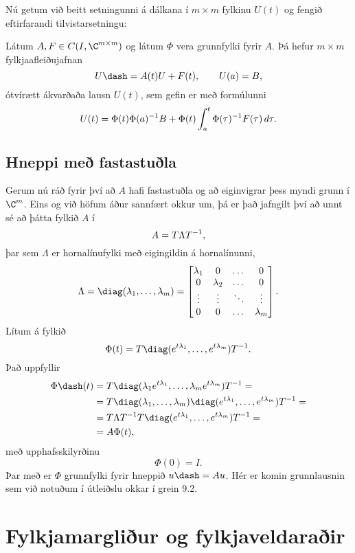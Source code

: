 \medskip
Nú getum við beitt setningunni á dálkana í $m\times m$ fylkinu $U(t)$ og
fengið eftirfarandi
tilvistarsetningu:

\begin{se}
Látum $A, F\in C(I,\C\sp {m\times m})$ og látum $\Phi$ vera grunnfylki
fyrir $A$.  Þá hefur $m\times m$
fylkjaafleiðujafnan
 $$U\dash=A(t)U+F(t), \qquad U(a)=B, 
 $$
ótvírætt ákvarðaða lausn $U(t)$,  sem gefin er með formúlunni
 $$U(t)=\Phi(t)\Phi(a)\sp{-1}B + \Phi(t)\int_a\sp t \Phi(\tau)\sp
{-1}F(\tau) \, d\tau.
 $$
\end{se}

\subsection*{Hneppi með fastastuðla}

Gerum nú ráð fyrir því að $A$ hafi fastastuðla og að eiginvigrar þess
myndi grunn í $\C\sp m$.  Eins og við höfum áður sannfært okkur um,
þá er það jafngilt því að unnt sé að þátta fylkið $A$ í 
 $$A=T\Lambda T\sp{-1},
 $$
þar sem $\Lambda$ er hornalínufylki með eigingildin á hornalínunni,
 $$\Lambda=\diag(\lambda_1,\dots,\lambda_m)=\left[\begin{matrix} 
\lambda_1&0&\dots&0\\
0&\lambda_2&\dots&0\\
\vdots&\vdots&\ddots&\vdots\\
0&0&\dots&\lambda_m\end{matrix}\right].
 $$
Lítum á fylkið 
 $$\Phi(t)=T\diag(e\sp{t\lambda_1},\dots,e\sp{t\lambda_m})T\sp{-1}.
 $$
Það uppfyllir
\begin{align*}
\Phi\dash(t)
&=T\diag(\lambda_1e\sp{t\lambda_1},\dots,\lambda_me\sp{t\lambda_m})T\sp{-1}=\\
&=T\diag(\lambda_1,\dots,\lambda_m)
\diag(e\sp{t\lambda_1},\dots,e\sp{t\lambda_m})T\sp{-1}=\\
&=T\Lambda T\sp{-1} T
\diag(e\sp{t\lambda_1},\dots,e\sp{t\lambda_m})T\sp{-1}=\\
&=A\Phi(t), 
\end{align*}
með upphafsskilyrðinu
$$
\Phi(0)=I.
$$
Þar með er $\Phi$ grunnfylki fyrir hneppið $u\dash =Au$.  Hér er
komin grunnlausnin sem við notuðum í útleiðslu okkar í grein 9.2.


\section{Fylkjamargliður og
fylkjaveldaraðir}

